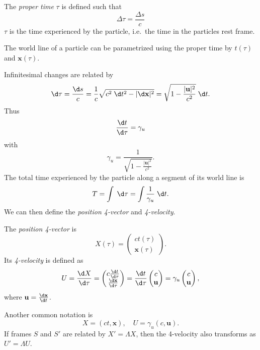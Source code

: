 \documentclass[a4paper]{article}
\begin{document}
\begin{defi}
  The \emph{proper time} $\tau$ is defined such that
  \[
    \Delta \tau = \frac{\Delta s}{c}
  \]
  $\tau$ is the time experienced by the particle, i.e.\ the time in the particles rest frame.
\end{defi}
The world line of a particle can be parametrized using the proper time by $t(\tau)$ and $\mathbf{x}(\tau)$.
\begin{center}
\end{center}
Infinitesimal changes are related by
\[
  \d \tau = \frac{\d s}{c} = \frac{1}{c}\sqrt{c^2\;\d t^2 - |\d \mathbf{x}|^2} = \sqrt{1 - \frac{|\mathbf{u}|^2}{c^2}}\;\d t.
\]
Thus
\[
  \frac{\d t}{\d \tau} = \gamma_u
\]
with
\[
  \gamma_u = \frac{1}{\sqrt{1 - \frac{|\mathbf{u}|^2}{c^2}}}.
\]
The total time experienced by the particle along a segment of its world line is
\[
  T = \int \;\d \tau = \int\frac{1}{\gamma_u}\;\d t.
\]
We can then define the \emph{position 4-vector} and \emph{4-velocity}.
\begin{defi}
  The \emph{position 4-vector} is
  \[
    X(\tau) =
    \begin{pmatrix}
      ct(\tau)\\
      \mathbf{x}(\tau)
    \end{pmatrix}.
  \]
  Its \emph{4-velocity} is defined as
  \[
    U = \frac{\d X}{\d \tau} =
    \begin{pmatrix}
      c\frac{\d t}{\d \tau}\\
      \frac{\d \mathbf{x}}{\d \tau}
    \end{pmatrix}
    = \frac{\d t}{\d \tau}
    \begin{pmatrix}
      c\\
      \mathbf{u}
    \end{pmatrix} = \gamma_u
    \begin{pmatrix}
      c\\
      \mathbf{u}
    \end{pmatrix},
  \]
  where $\mathbf{u} = \frac{\d \mathbf{x}}{\d t}$.
\end{defi}
Another common notation is
\[
  X = (ct, \mathbf{x}),\quad U = \gamma_u (c, \mathbf{u}).
\]
If frames $S$ and $S'$ are related by $X' = \Lambda X$, then the 4-velocity also transforms as $U' = \Lambda U$.
\end{document}
